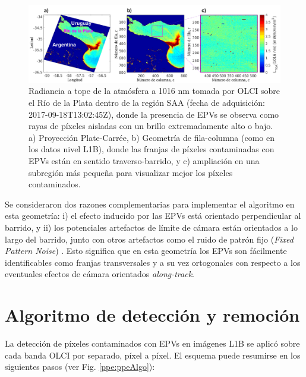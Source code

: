     \begin{figure}
    \centering
    \includegraphics[width=\textwidth]{ppe/figures/ppeRdP}
    \caption[Radiancia a tope de la atmósfera a 1016 nm tomada por OLCI sobre el RdP (SAA) afectada por la presencia de EPVs.]{Radiancia a tope de la atmósfera a 1016 nm tomada por OLCI sobre el Río de la Plata dentro de la región SAA (fecha de adquisición: 2017-09-18T13:02:45Z), donde la presencia de EPVs se observa como rayas de píxeles aisladas con un brillo extremadamente alto o bajo. a) Proyección Plate-Carrée, b) Geometría de fila-columna (como en los datos nivel L1B), donde las franjas de píxeles contaminadas con EPVs están en sentido traverso-barrido, y c) ampliación en una subregión más pequeña para visualizar mejor los píxeles contaminados.}
    \label{ppe:ppeRdP}
    \end{figure}

    Se consideraron dos razones complementarias para implementar el algoritmo en esta geometría: i) el efecto inducido por las EPVs está orientado perpendicular al barrido, y ii) los potenciales artefactos de límite de cámara están orientados a lo largo del barrido, junto con otros artefactos como el ruido de patrón fijo (\textit{Fixed Pattern Noise}) \cite{damico2015}. Esto significa que en esta geometría los EPVs son fácilmente identificables como franjas transversales y a su vez ortogonales con respecto a los eventuales efectos de cámara orientados \textit{along-track}.

\section{Algoritmo de detección y remoción}
\label{ppe:s:algo}

    La detección de píxeles contaminados con EPVs en imágenes L1B se aplicó sobre cada banda OLCI por separado, píxel a píxel. El esquema puede resumirse en los siguientes pasos (ver Fig. \ref{ppe:ppeAlgo}):
    
